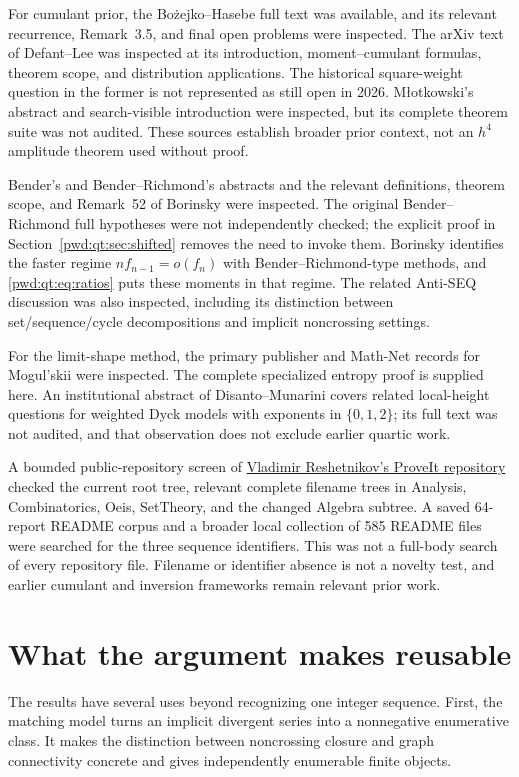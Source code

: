 \documentclass[11pt,letterpaper]{article}
\numberwithin{equation}{section}
\theoremstyle{remark}\newtheorem{remark}[theorem]{Remark}
\begin{document}
For cumulant prior, the Bo\.{z}ejko--Hasebe full text \cite{bozejko} was available, and its relevant recurrence, Remark~3.5, and final open problems were inspected. The arXiv text of Defant--Lee \cite{defantlee} was inspected at its introduction, moment--cumulant formulas, theorem scope, and distribution applications. The historical square-weight question in the former is not represented as still open in 2026. M\l otkowski's abstract and search-visible introduction \cite{mlotkowski} were inspected, but its complete theorem suite was not audited. These sources establish broader prior context, not an $h^4$ amplitude theorem used without proof.

Bender's and Bender--Richmond's abstracts \cite{bender,benderrichmond} and the relevant definitions, theorem scope, and Remark~52 of Borinsky \cite{borinsky} were inspected. The original Bender--Richmond full hypotheses were not independently checked; the explicit proof in Section~\ref{pwd:qt:sec:shifted} removes the need to invoke them. Borinsky identifies the faster regime $nf_{n-1}=o(f_n)$ with Bender--Richmond-type methods, and \eqref{pwd:qt:eq:ratios} puts these moments in that regime. The related Anti-SEQ discussion \cite{antiseq} was also inspected, including its distinction between set/sequence/cycle decompositions and implicit noncrossing settings.

For the limit-shape method, the primary publisher and Math-Net records for Mogul'skii \cite{mogulskii} were inspected. The complete specialized entropy proof is supplied here. An institutional abstract of Disanto--Munarini \cite{disanto} covers related local-height questions for weighted Dyck models with exponents in $\{0,1,2\}$; its full text was not audited, and that observation does not exclude earlier quartic work.

A bounded public-repository screen of \href{https://github.com/VladimirReshetnikov/ProveIt}{Vladimir Reshetnikov's ProveIt repository} checked the current root tree, relevant complete filename trees in Analysis, Combinatorics, Oeis, SetTheory, and the changed Algebra subtree. A saved 64-report README corpus and a broader local collection of 585 README files were searched for the three sequence identifiers. This was not a full-body search of every repository file. Filename or identifier absence is not a novelty test, and earlier cumulant and inversion frameworks remain relevant prior work.

\section{What the argument makes reusable}\label{pwd:qt:sec:utility}
The results have several uses beyond recognizing one integer sequence. First, the matching model turns an implicit divergent series into a nonnegative enumerative class. It makes the distinction between noncrossing closure and graph connectivity concrete and gives independently enumerable finite objects.
\end{document}
